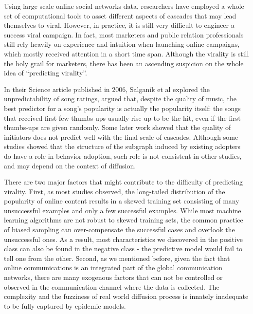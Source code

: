 \documentclass[phd,tocprelim]{cornell}
\begin{document}
Using large scale online social networks data, researchers have employed a whole set of computational tools to asset different aspects of cascades that may lead themselves to viral. However, in practice, it is still very difficult to engineer a success viral campaign\cite{Bakshy-2011}. In fact, most marketers and public relation professionals still rely heavily on experience and intuition when launching online campaigns, which mostly received attention in a short time span\cite{Yang-2011,crane:2008,Wu-ICWSM-2011,Wu-Twitter-2011}. Although the virality is still the holy grail for marketers, there has been an ascending suspicion on the whole idea of ``predicting virality''.

In their Science article published in 2006, Salganik et al\cite{Salganik-2006} explored the unpredictability of song ratings, argued that, despite the quality of music, the best predictor for a song's popularity is actually the popularity itself: the songs that received first few thumbs-ups usually rise up to be the hit, even if the first thumbs-ups are given randomly. Some later work showed that the quality of initiators does not predict well with the final scale of cascades\cite{Sun-2009,Bakshy-2011}. Although some studies showed that the structure of the subgraph induced by existing adopters do have a role in behavior adoption\cite{Backstrom:2006,Romero-2011,Leskovec-SDM-07}, such role is not consistent in other studies\cite{Bakshy-2011}, and may depend on the context of diffusion\cite{Centola:2007}.

There are two major factors that might contribute to the difficulty of predicting virality. First, as most studies observed, the long-tailed distribution of the popularity of online content results in a skewed training set consisting of many unsuccessful examples and only a few successful examples. While most machine learning algorithms are not robust to skewed training sets\cite{Provost-2000}, the common practice of biased sampling can over-compensate the successful cases and overlook the unsuccessful ones. As a result, most characteristics we discovered in the positive class can also be found in the negative class - the predictive model would fail to tell one from the other. Second, as we mentioned before, given the fact that online communications is an integrated part of the global communication networks, there are many exogenous factors that can not be controlled or observed in the communication channel where the data is collected. The complexity and the fuzziness of real world diffusion process is innately inadequate to be fully captured by epidemic models\cite{Bakshy-2011,Cha-2010}.
\end{document}

